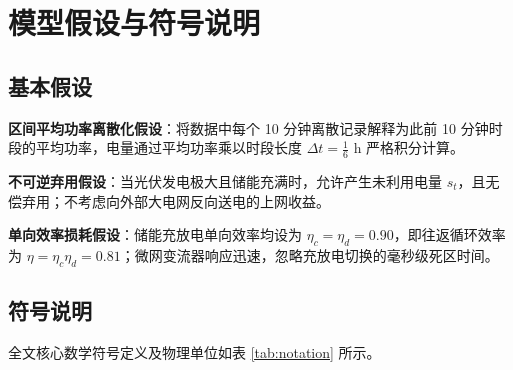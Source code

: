 \documentclass[withoutpreface]{cumcmthesis}
\begin{document}
\section{模型假设与符号说明}

\subsection{基本假设}
\begin{assumption}
    \textbf{区间平均功率离散化假设}：将数据中每个 10 分钟离散记录解释为此前 10 分钟时段的平均功率，电量通过平均功率乘以时段长度 $\Delta t = \frac{1}{6}\text{ h}$ 严格积分计算。
\end{assumption}
\begin{assumption}
    \textbf{不可逆弃用假设}：当光伏发电极大且储能充满时，允许产生未利用电量 $s_t$，且无偿弃用；不考虑向外部大电网反向送电的上网收益。
\end{assumption}
\begin{assumption}
    \textbf{单向效率损耗假设}：储能充放电单向效率均设为 $\eta_c = \eta_d = 0.90$，即往返循环效率为 $\eta = \eta_c \eta_d = 0.81$；微网变流器响应迅速，忽略充放电切换的毫秒级死区时间。
\end{assumption}

\subsection{符号说明}
全文核心数学符号定义及物理单位如表 \ref{tab:notation} 所示。
\end{document}
